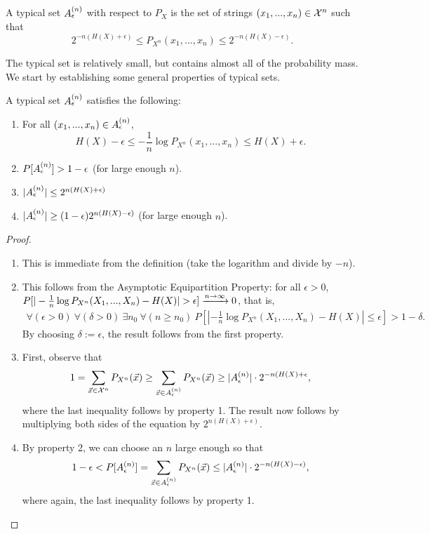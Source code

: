 \begin{definition}
A typical set $A_{\epsilon}^{(n)}$ with respect to $P_X$ is the set of strings $(x_1, ..., x_n) \in {\cal X}^n$ such that
\[
2^{-n (H(X) + \epsilon)} \leq P_{X^n}(x_1, ..., x_n) \leq 2^{-n(H(X) - \epsilon)}.
\]
\end{definition}
The typical set is relatively small, but contains almost all of the probability mass. We start by establishing some general properties of typical sets.

\begin{proposition}\label{prop:typset-properties}
A typical set $A_{\epsilon}^{(n)}$ satisfies the following:
\begin{enumerate}
\item For all $(x_1, ..., x_n) \in A_{\epsilon}^{(n)}$, \[H(X) - \epsilon \leq - \frac{1}{n} \log P_{X^n}(x_1, ..., x_n) \leq H(X) + \epsilon.\]
\item $P[A_{\epsilon}^{(n)}] > 1 - \epsilon$ (for large enough $n$).
\item $|A_{\epsilon}^{(n)}| \leq 2^{n(H(X) + \epsilon)}$
\item $|A_{\epsilon}^{(n)}| \geq (1-\epsilon) 2^{n(H(X) - \epsilon)}$ (for large enough $n$).
\end{enumerate}
\end{proposition}
\begin{proof}\ 
\begin{enumerate}
\item This is immediate from the definition (take the logarithm and divide by $-n$).
\item This follows from the Asymptotic Equipartition Property: for all $\epsilon > 0$, $P[|-\frac{1}{n} \log P_{X^n}(X_1, ..., X_n) - H(X)| > \epsilon] \xrightarrow{n \to \infty} 0$, that is,
\begin{align}\forall (\epsilon > 0) \ \forall (\delta > 0) \ \exists n_0 \ \forall (n \geq n_0) \ P[|-\frac{1}{n} \log P_{X^n}(X_1, ..., X_n) - H(X)| \leq \epsilon] > 1 - \delta.
\end{align}
By choosing $\delta := \epsilon$, the result follows from the first property.
\item First, observe that
\begin{align}
1 = \sum_{\vec{x} \in \mathcal{X}^n} P_{X^n}(\vec{x}) \geq \sum_{\vec{x} \in A_{\epsilon}^{(n)}} P_{X^n}(\vec{x}) \geq |A_{\epsilon}^{(n)}| \cdot 2^{-n(H(X) + \epsilon},
\end{align}
where the last inequality follows by property 1. The result now follows by multiplying both sides of the equation by $2^{n(H(X) + \epsilon)}$.
\item By property 2, we can choose an $n$ large enough so that
\begin{align}
1 - \epsilon < P[A_{\epsilon}^{(n)}] = \sum_{\vec{x} \in A_{\epsilon}^{(n)}} P_{X^n}(\vec{x}) \leq |A_{\epsilon}^{(n)}| \cdot 2^{-n(H(X)-\epsilon)},
\end{align}
where again, the last inequality follows by property 1.
\end{enumerate}
\end{proof}



